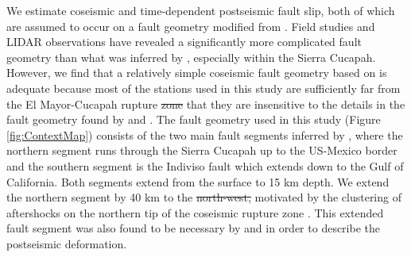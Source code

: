 \documentclass[draft,linenumbers]{AGUJournal}
\providecommand{\DIFadd}[1]{{\protect\color{blue}\uwave{#1}}} %
\providecommand{\DIFdel}[1]{{\protect\color{red}\sout{#1}}}                      %
\providecommand{\DIFaddbegin}{} %
\providecommand{\DIFaddend}{} %
\providecommand{\DIFdelbegin}{} %
\providecommand{\DIFdelend}{} %
\begin{document}
We estimate coseismic and time-dependent postseismic fault slip, both of which are assumed to occur on a fault geometry modified from \citet{Wei2011}.  Field studies \citep{Fletcher2014} and LIDAR observations \citep{Oskin2012} have revealed a significantly more complicated fault geometry than what was inferred by \citet{Wei2011}, especially within the Sierra Cucapah.  However, we find that a relatively simple coseismic fault geometry based on \citep{Wei2011} is adequate because most of the stations used in this study are sufficiently far from the El Mayor-Cucapah rupture \DIFdelbegin \DIFdel{zone }\DIFdelend that they are insensitive to the details in the fault geometry found by \citet{Fletcher2014} and \citet{Oskin2012}.  The fault geometry used in this study (Figure \ref{fig:ContextMap}) consists of the two main fault segments inferred by \citet{Wei2011}, where the northern segment runs through the Sierra Cucapah up to the US-Mexico border and the southern segment is the Indiviso fault which extends down to the Gulf of California. Both segments extend from the surface to 15 km depth.  We extend the northern segment by 40 km to the \DIFdelbegin \DIFdel{north-west, }\DIFdelend \DIFaddbegin \DIFadd{northwest, which is }\DIFaddend motivated by the clustering of aftershocks on the northern tip of the coseismic rupture zone \citep{Hauksson2011,Kroll2013}.  This extended fault segment was also found to be necessary by \citet{Rollins2015} and \citet{Pollitz2012} in order to describe the postseismic deformation. 
\end{document}
